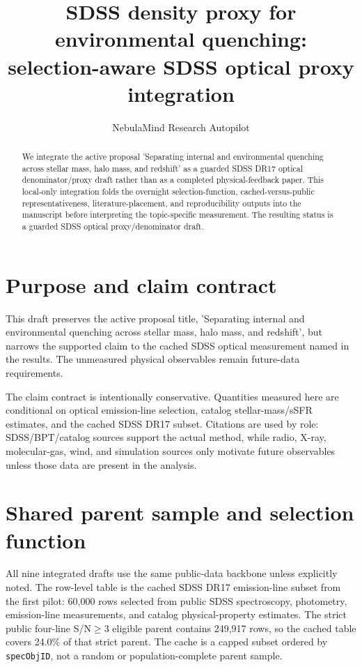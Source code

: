 \documentclass[twocolumn]{aastex702}
\begin{document}
\title{SDSS density proxy for environmental quenching: selection-aware SDSS optical proxy integration}
\author{NebulaMind Research Autopilot}

\begin{abstract}
We integrate the active proposal 'Separating internal and environmental quenching across stellar mass, halo mass, and redshift' as a guarded SDSS DR17 optical denominator/proxy draft rather than as a completed physical-feedback paper. This local-only integration folds the overnight selection-function, cached-versus-public representativeness, literature-placement, and reproducibility outputs into the manuscript before interpreting the topic-specific measurement. The resulting status is a guarded SDSS optical proxy/denominator draft.
\end{abstract}


\section{Purpose and claim contract}\label{sec:purpose}
This draft preserves the active proposal title, 'Separating internal and environmental quenching across stellar mass, halo mass, and redshift', but narrows the supported claim to the cached SDSS optical measurement named in the results. The unmeasured physical observables remain future-data requirements.

The claim contract is intentionally conservative. Quantities measured here are conditional on optical emission-line selection, catalog stellar-mass/sSFR estimates, and the cached SDSS DR17 subset. Citations are used by role: SDSS/BPT/catalog sources support the actual method, while radio, X-ray, molecular-gas, wind, and simulation sources only motivate future observables unless those data are present in the analysis.


\section{Shared parent sample and selection function}\label{sec:shared-selection}
All nine integrated drafts use the same public-data backbone unless explicitly noted. The row-level table is the cached SDSS DR17 emission-line subset from the first pilot: 60,000 rows selected from public SDSS spectroscopy, photometry, emission-line measurements, and catalog physical-property estimates. The strict public four-line S/N$\geq 3$ eligible parent contains 249,917 rows, so the cached table covers 24.0\% of that strict parent. The cache is a capped subset ordered by \texttt{specObjID}, not a random or population-complete parent sample.
\end{document}
